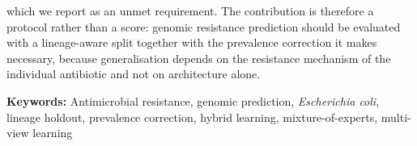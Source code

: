 which we report as an unmet requirement. The contribution is therefore a protocol rather than a score: genomic resistance prediction should be evaluated with a lineage-aware split together with the prevalence correction it makes necessary, because generalisation depends on the resistance mechanism of the individual antibiotic and not on architecture alone.

\vspace{0.35cm}
\textbf{Keywords:} Antimicrobial resistance, genomic prediction, \textit{Escherichia coli}, lineage holdout, prevalence correction, hybrid learning, mixture-of-experts, multi-view learning
\pagebreak